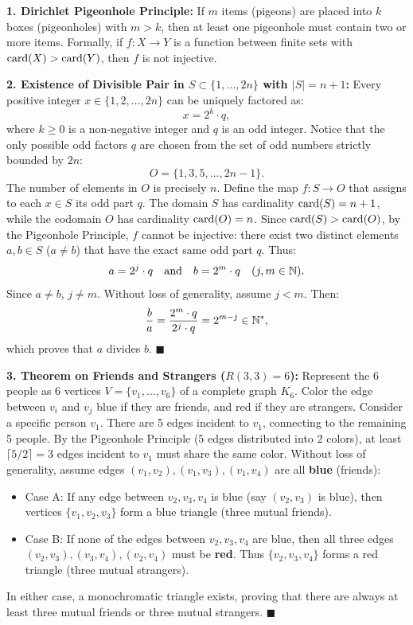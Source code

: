 \begin{solution}
\textbf{1. Dirichlet Pigeonhole Principle:}
If $m$ items (pigeons) are placed into $k$ boxes (pigeonholes) with $m > k$, then at least one pigeonhole must contain two or more items.
Formally, if $f: X \to Y$ is a function between finite sets with $\operatorname{card}(X) > \operatorname{card}(Y)$, then $f$ is not injective.

\textbf{2. Existence of Divisible Pair in $S \subset \{1, \dots, 2n\}$ with $|S| = n + 1$:}
Every positive integer $x \in \{1, 2, \dots, 2n\}$ can be uniquely factored as:
\[
x = 2^k \cdot q,
\]
where $k \ge 0$ is a non-negative integer and $q$ is an odd integer.
Notice that the only possible odd factors $q$ are chosen from the set of odd numbers strictly bounded by $2n$:
\[
O = \{1, 3, 5, \dots, 2n - 1\}.
\]
The number of elements in $O$ is precisely $n$.
Define the map $f: S \to O$ that assigns to each $x \in S$ its odd part $q$.
The domain $S$ has cardinality $\operatorname{card}(S) = n + 1$, while the codomain $O$ has cardinality $\operatorname{card}(O) = n$.
Since $\operatorname{card}(S) > \operatorname{card}(O)$, by the Pigeonhole Principle, $f$ cannot be injective: there exist two distinct elements $a, b \in S$ ($a \ne b$) that have the exact same odd part $q$.
Thus:
\[
a = 2^j \cdot q \quad \text{and} \quad b = 2^m \cdot q \quad (j, m \in \mathbb{N}).
\]
Since $a \ne b$, $j \ne m$. Without loss of generality, assume $j < m$.
Then:
\[
\frac{b}{a} = \frac{2^m \cdot q}{2^j \cdot q} = 2^{m - j} \in \mathbb{N}^*,
\]
which proves that $a$ divides $b$. \hfill $\blacksquare$

\textbf{3. Theorem on Friends and Strangers ($R(3,3) = 6$):}
Represent the 6 people as 6 vertices $V = \{v_1, \dots, v_6\}$ of a complete graph $K_6$. Color the edge between $v_i$ and $v_j$ blue if they are friends, and red if they are strangers.
Consider a specific person $v_1$. There are 5 edges incident to $v_1$, connecting to the remaining 5 people.
By the Pigeonhole Principle ($5$ edges distributed into $2$ colors), at least $\lceil 5/2 \rceil = 3$ edges incident to $v_1$ must share the same color.
Without loss of generality, assume edges $(v_1, v_2), (v_1, v_3), (v_1, v_4)$ are all \textbf{blue} (friends):
\begin{itemize}[leftmargin=1.5em,itemsep=2pt]
  \item Case A: If any edge between $v_2, v_3, v_4$ is blue (say $(v_2, v_3)$ is blue), then vertices $\{v_1, v_2, v_3\}$ form a blue triangle (three mutual friends).
  \item Case B: If none of the edges between $v_2, v_3, v_4$ are blue, then all three edges $(v_2, v_3), (v_3, v_4), (v_2, v_4)$ must be \textbf{red}. Thus $\{v_2, v_3, v_4\}$ forms a red triangle (three mutual strangers).
\end{itemize}
In either case, a monochromatic triangle exists, proving that there are always at least three mutual friends or three mutual strangers. \hfill $\blacksquare$
\end{solution}



